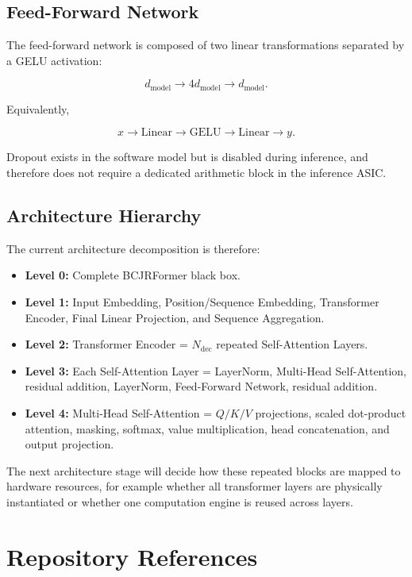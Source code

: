 \documentclass[11pt,a4paper]{article}
\begin{document}
\subsection{Feed-Forward Network}

The feed-forward network is composed of two linear transformations separated by
a GELU activation:

\[
d_{\mathrm{model}}
\rightarrow
4d_{\mathrm{model}}
\rightarrow
d_{\mathrm{model}}.
\]

Equivalently,

\[
x
\rightarrow
\text{Linear}
\rightarrow
\text{GELU}
\rightarrow
\text{Linear}
\rightarrow
y.
\]

Dropout exists in the software model but is disabled during inference, and
therefore does not require a dedicated arithmetic block in the inference ASIC.

\subsection{Architecture Hierarchy}

The current architecture decomposition is therefore:

\begin{itemize}
    \item \textbf{Level 0:} Complete BCJRFormer black box.
    \item \textbf{Level 1:} Input Embedding, Position/Sequence Embedding,
    Transformer Encoder, Final Linear Projection, and Sequence Aggregation.
    \item \textbf{Level 2:} Transformer Encoder =
    $N_{\mathrm{dec}}$ repeated Self-Attention Layers.
    \item \textbf{Level 3:} Each Self-Attention Layer =
    LayerNorm, Multi-Head Self-Attention, residual addition,
    LayerNorm, Feed-Forward Network, residual addition.
    \item \textbf{Level 4:} Multi-Head Self-Attention =
    $Q/K/V$ projections, scaled dot-product attention, masking,
    softmax, value multiplication, head concatenation, and output projection.
\end{itemize}

The next architecture stage will decide how these repeated blocks are mapped to
hardware resources, for example whether all transformer layers are physically
instantiated or whether one computation engine is reused across layers.


\section{Repository References}
\end{document}
